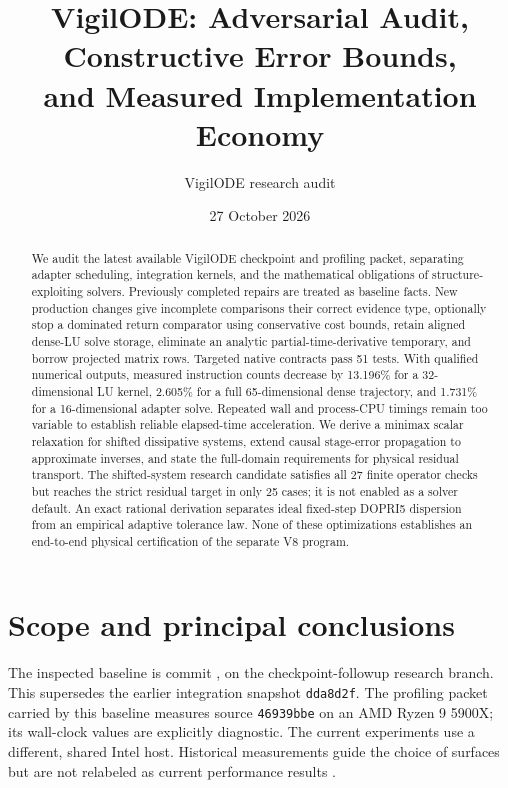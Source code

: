 \documentclass[aps,prd,reprint,amsmath,amssymb,longbibliography,nofootinbib]{revtex4-2}
\newcommand{\code}[1]{\texttt{#1}}
\begin{document}
\title{VigilODE: Adversarial Audit, Constructive Error Bounds,\texorpdfstring{\\}{ }and Measured Implementation Economy}
\author{VigilODE research audit}
\noaffiliation
\date{27 October 2026}
\begin{abstract}
We audit the latest available VigilODE checkpoint and profiling packet, separating adapter scheduling, integration kernels, and the mathematical obligations of structure-exploiting solvers. Previously completed repairs are treated as baseline facts. New production changes give incomplete comparisons their correct evidence type, optionally stop a dominated return comparator using conservative cost bounds, retain aligned dense-LU solve storage, eliminate an analytic partial-time-derivative temporary, and borrow projected matrix rows. Targeted native contracts pass 51 tests. With qualified numerical outputs, measured instruction counts decrease by 13.196\% for a 32-dimensional LU kernel, 2.605\% for a full 65-dimensional dense trajectory, and 1.731\% for a 16-dimensional adapter solve. Repeated wall and process-CPU timings remain too variable to establish reliable elapsed-time acceleration. We derive a minimax scalar relaxation for shifted dissipative systems, extend causal stage-error propagation to approximate inverses, and state the full-domain requirements for physical residual transport. The shifted-system research candidate satisfies all 27 finite operator checks but reaches the strict residual target in only 25 cases; it is not enabled as a solver default. An exact rational derivation separates ideal fixed-step DOPRI5 dispersion from an empirical adaptive tolerance law. None of these optimizations establishes an end-to-end physical certification of the separate V8 program.
\end{abstract}
\maketitle

\section{Scope and principal conclusions}
\label{sec:scope}
The inspected baseline is commit , on the checkpoint-followup research branch. This supersedes the earlier integration snapshot \code{dda8d2f}. The profiling packet carried by this baseline measures source \code{46939bbe} on an AMD Ryzen 9 5900X; its wall-clock values are explicitly diagnostic. The current experiments use a different, shared Intel host. Historical measurements guide the choice of surfaces but are not relabeled as current performance results \cite{ProfilePacket,CheckpointPacket,IntegrationPacket}.
\end{document}
